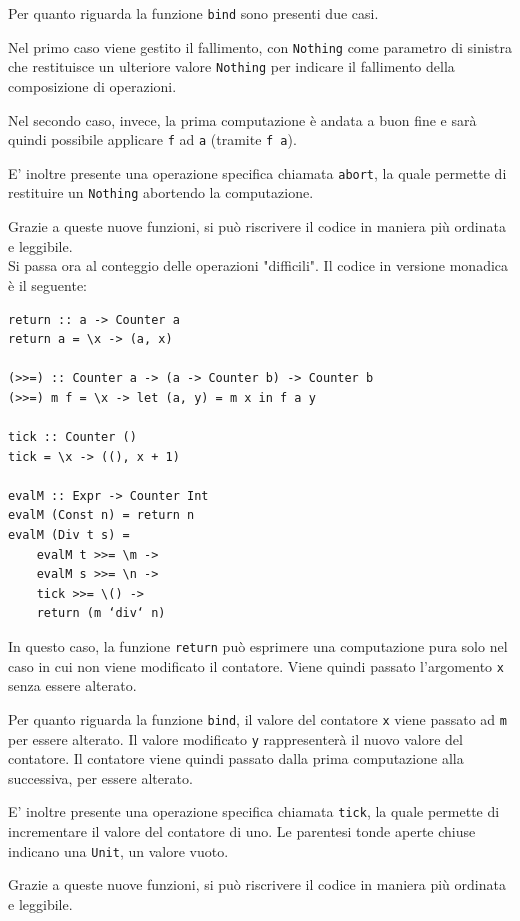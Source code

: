 \documentclass{article}
\begin{document}
Per quanto riguarda la funzione \texttt{bind} sono presenti due casi.

Nel primo caso viene gestito il fallimento, con \texttt{Nothing} come parametro di sinistra che restituisce un ulteriore valore \texttt{Nothing} per indicare il fallimento della composizione di operazioni.

Nel secondo caso, invece, la prima computazione è andata a buon fine e sarà quindi possibile applicare \texttt{f} ad \texttt{a} (tramite \texttt{f a}).

E' inoltre presente una operazione specifica chiamata \texttt{abort}, la quale permette di restituire un \texttt{Nothing} abortendo la computazione.

Grazie a queste nuove funzioni, si può riscrivere il codice in maniera più ordinata e leggibile.\vspace{14pt}\\
Si passa ora al conteggio delle operazioni "difficili". Il codice in versione monadica è il seguente:
\begin{tcolorbox}
\begin{verbatim}
return :: a -> Counter a
return a = \x -> (a, x)

(>>=) :: Counter a -> (a -> Counter b) -> Counter b
(>>=) m f = \x -> let (a, y) = m x in f a y

tick :: Counter ()
tick = \x -> ((), x + 1)

evalM :: Expr -> Counter Int
evalM (Const n) = return n
evalM (Div t s) =
    evalM t >>= \m ->
    evalM s >>= \n ->
    tick >>= \() ->
    return (m ‘div‘ n)
\end{verbatim}
\end{tcolorbox}
In questo caso, la funzione \texttt{return} può esprimere una computazione pura solo nel caso in cui non viene modificato il contatore. Viene quindi passato l'argomento \texttt{x} senza essere alterato.

Per quanto riguarda la funzione \texttt{bind}, il valore del contatore \texttt{x} viene passato ad \texttt{m} per essere alterato. Il valore modificato \texttt{y} rappresenterà il nuovo valore del contatore. Il contatore viene quindi passato dalla prima computazione alla successiva, per essere alterato.

E’ inoltre presente una operazione specifica chiamata \texttt{tick}, la quale permette di incrementare il valore del contatore di uno. Le parentesi tonde aperte chiuse indicano una \texttt{Unit}, un valore vuoto.

Grazie a queste nuove funzioni, si può riscrivere il codice in maniera più ordinata e leggibile.
\end{document}
